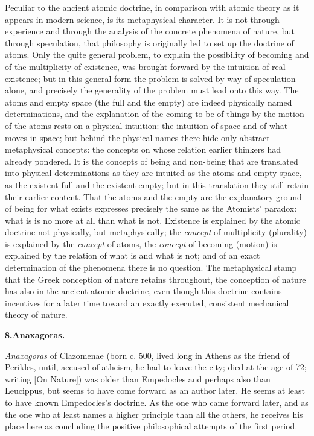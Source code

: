 Peculiar to the ancient atomic doctrine, in comparison with
atomic theory as it appears in modern science, is its metaphysical
character. It is not through experience and through the analysis of
the concrete phenomena of nature, but through speculation, that
philosophy is originally led to set up the doctrine of atoms. Only the
quite general problem, to explain the possibility of becoming and of
the multiplicity of existence, was brought forward by the intuition of
real existence; but in this general form the problem is solved by way
of speculation alone, and precisely the generality of the problem must
lead onto this way. The atoms and empty space (the full and the empty)
are indeed physically named determinations, and the explanation of the
coming-to-be of things by the motion of the atoms rests on a physical
intuition: the intuition of space and of what moves in space; but
behind the physical names there hide only abstract metaphysical
concepts: the concepts on whose relation earlier thinkers had already
pondered. It is the concepts of being and non-being that are translated
into physical determinations as they are intuited as the atoms and
empty space, as the existent full and the existent empty; but in this
translation they still retain their earlier content. That the atoms
and the empty are the explanatory ground of being for what exists
expresses precisely the same as the Atomists' paradox: what is is no
more at all than what is not. Existence is explained by the atomic
doctrine not physically, but metaphysically; the \emph{concept} of
multiplicity (plurality) is explained by the \emph{concept} of atoms,
the \emph{concept} of becoming (motion) is explained by the relation of
what is and what is not; and of an exact determination of the phenomena
there is no question. The metaphysical stamp that the Greek conception
of nature retains throughout, the conception of nature has also in the
ancient atomic doctrine, even though this doctrine contains incentives
for a later time toward an exactly executed, consistent mechanical
theory of nature.

\divrule

\begin{center}
\textbf{8.\enspace Anaxagoras.}
\end{center}

\emph{Anaxagoras} of Clazomenae (born c. 500, lived long in Athens as
the friend of Perikles, until, accused of atheism, he had to leave the
city; died at the age of 72; writing  [On Nature]) was
older than Empedocles and perhaps also than Leucippus, but seems to
have come forward as an author later. He seems at least to have known
Empedocles's doctrine. As the one who came forward later, and as the
one who at least names a higher principle than all the others, he
receives his place here as concluding the positive philosophical
attempts of the first period.

